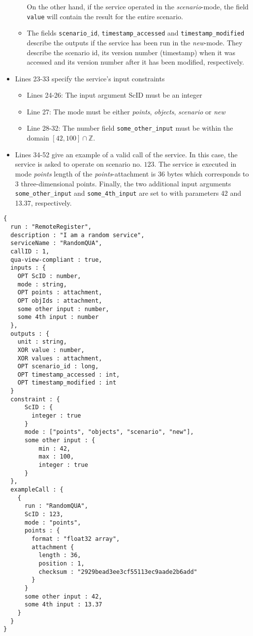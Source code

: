 \begin{itemize}
\begin{itemize}
        On the other hand, if the service operated in the \emph{scenario}-mode, the field \texttt{value} will contain the result for the entire scenario.
      \item The fields \texttt{scenario\_id}, \texttt{timestamp\_accessed} and \texttt{timestamp\_modified} describe the outputs if the service has been run in the \emph{new}-mode. They describe the scenario id, its version number (timestamp) when it was accessed and its version number after it has been modified, respectively.
    \end{itemize}
  \item Lines 23-33 specify the service's input constraints
    \begin{itemize}
      \item Lines 24-26: The input argument ScID must be an integer
      \item Line 27: The mode must be either \emph{points}, \emph{objects}, \emph{scenario} or \emph{new}
      \item Line 28-32: The number field \texttt{some\_other\_input} must be within the domain $[42,100] \cap \mathbb{Z}$.
    \end{itemize}
  \item Lines 34-52 give an example of a valid call of the service. In this case, the service is asked to operate on scenario no. $123$. The service is executed in mode \emph{points} length of the \emph{points}-attachment is 36 bytes which corresponds to 3 three-dimensional points. Finally, the two additional input arguments \texttt{some\_other\_input} and \texttt{some\_4th\_input} are set to with parameters 42 and 13.37, respectively.
\end{itemize}

\newpage

\begin{lstlisting}[caption={Registering a QUA-compliant service}, label={lst:quacompliance}]
{
  run : "RemoteRegister",
  description : "I am a random service",
  serviceName : "RandomQUA",
  callID : 1,
  qua-view-compliant : true,
  inputs : {
    OPT ScID : number,
    mode : string,
    OPT points : attachment,
    OPT objIds : attachment,
    some other input : number,
    some 4th input : number
  },
  outputs : {
    unit : string,
    XOR value : number,
    XOR values : attachment,
    OPT scenario_id : long,
    OPT timestamp_accessed : int,
    OPT timestamp_modified : int
  }
  constraint : {
      ScID : {
        integer : true
      }
      mode : ["points", "objects", "scenario", "new"],
      some other input : {
          min : 42,
          max : 100,
          integer : true
      }
  },
  exampleCall : {
    {
      run : "RandomQUA",
      ScID : 123,
      mode : "points",
      points : {
        format : "float32 array",
        attachment {
          length : 36,
          position : 1,
          checksum : "2929bead3ee3cf55113ec9aade2b6add"
        }
      }
      some other input : 42,
      some 4th input : 13.37
    }
  }
}
\end{lstlisting}


\clearpage
